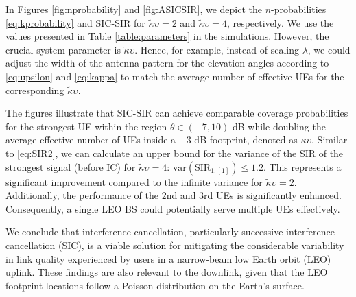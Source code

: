 \documentclass[lettersize,journal]{IEEEtran}
\begin{document}
In Figures \ref{fig:nprobability} and \ref{fig:ASICSIR}, we depict the $n$-probabilities \eqref{eq:kprobability} and SIC-SIR for $\tilde{\kappa}\upsilon=2$ and  $\tilde{\kappa}\upsilon=4$, respectively. We use the values presented in Table \ref{table:parameters} in the simulations. However, the crucial system parameter is $\tilde{\kappa}\upsilon$. Hence, for example, instead of scaling $\lambda$, we could adjust the width of the antenna pattern for the elevation angles according to \eqref{eq:upsilon} and \eqref{eq:kappa} to match the average number of effective UEs for the corresponding $\tilde{\kappa} \upsilon$.

The figures illustrate that SIC-SIR can achieve comparable coverage probabilities for the strongest UE within the region $\theta \in (-7,10)$ dB while doubling the average effective number of UEs inside a $-3$ dB footprint, denoted as $\kappa \upsilon$. Similar to \eqref{eq:SIR2}, we can calculate an upper bound for the variance of the SIR of the strongest signal (before IC) for $\tilde{\kappa} \upsilon = 4$: $\text{var}(\text{SIR}_{1,[1]}) \leq 1.2$. This represents a significant improvement compared to the infinite variance for $\tilde{\kappa} \upsilon = 2$. Additionally, the performance of the $2$nd and $3$rd UEs is significantly enhanced. Consequently, a single LEO BS could potentially serve multiple UEs effectively.

We conclude that interference cancellation, particularly successive interference cancellation (SIC), is a viable solution for mitigating the considerable variability in link quality experienced by users in a narrow-beam low Earth orbit (LEO) uplink. These findings are also relevant to the downlink, given that the LEO footprint locations follow a Poisson distribution on the Earth's surface.















%

\end{document}
